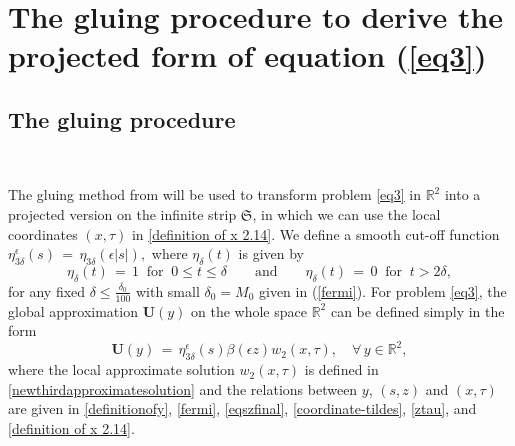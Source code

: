 \documentclass[10pt, reqno]{amsart}
\numberwithin{equation}{section}
\theoremstyle{definition}
\begin{document}
{{\medskip
\section{The gluing procedure to derive the projected form of equation  (\ref{eq3})}
\label{Section6}




\subsection{ The gluing procedure} \label{Section6.1}\


The gluing method from \cite{delPKowWei1} will be used to transform problem \eqref{eq3} in ${\mathbb R}^2$
into a projected version on the infinite strip ${\mathfrak S}$, in which we can use the local coordinates $(x, \tau)$ in \eqref{definition of x 2.14}.
We define a smooth cut-off function
$
\eta_{3\delta}^{\epsilon}(s) \,=\, \eta_{3\delta}(\epsilon |s|),
$
where $\eta_{\delta}(t)$ is given by
$$
\eta_{\delta}(t) \,=\, 1\ \mbox{ for }\ 0\leq t\leq \delta
\qquad \mbox{and}\qquad
\eta_{\delta}(t) \,=\, 0
\ \mbox{ for }\ t>2\delta,
$$
for any fixed $\delta\leq \frac{\delta_0}{100}$ with small $\delta_0=M_0$ given in (\ref{fermi}).
For problem \eqref{eq3}, the global approximation $\mathbf{U}(y)$ on the whole space ${\mathbb R}^2$ can be defined simply in the form
\begin{equation}\label{defofbfU}
\mathbf{U}(y) \,=\,
\eta_{3\delta}^\epsilon(s) \beta(\epsilon z)w_2(x, \tau), \quad \forall\,y \in {\mathbb R}^2,
\end{equation}
where the local approximate solution $w_2 (x, \tau)$ is defined in \eqref{newthirdapproximatesolution} and the relations between $y$, $(s, z)$ and $ (x,\tau)$
are given in \eqref{definitionofy}, \eqref{fermi}, \eqref{eqszfinal}, \eqref{coordinate-tildes}, \eqref{ztau}, and \eqref{definition of x 2.14}.

}}
\end{document}
